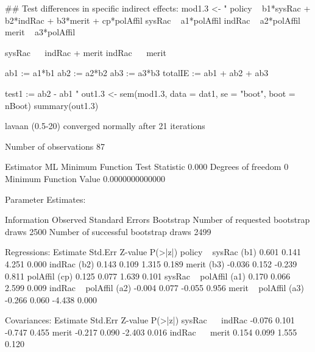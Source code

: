 \begin{Schunk}
\begin{Sinput}
 ## Test differences in specific indirect effects:
 mod1.3 <- "
 policy ~ b1*sysRac + b2*indRac + b3*merit + cp*polAffil
 sysRac ~ a1*polAffil
 indRac ~ a2*polAffil
 merit ~ a3*polAffil
 
 sysRac ~~ indRac + merit
 indRac ~~ merit
 
 ab1 := a1*b1
 ab2 := a2*b2
 ab3 := a3*b3
 totalIE := ab1 + ab2 + ab3
 
 test1 := ab2 - ab1
 "
 out1.3 <- 
     sem(mod1.3, data = dat1, se = "boot", boot = nBoot)
 summary(out1.3)
\end{Sinput}
\begin{Soutput}
lavaan (0.5-20) converged normally after  21 iterations

  Number of observations                            87

  Estimator                                         ML
  Minimum Function Test Statistic                0.000
  Degrees of freedom                                 0
  Minimum Function Value               0.0000000000000

Parameter Estimates:

  Information                                 Observed
  Standard Errors                            Bootstrap
  Number of requested bootstrap draws             2500
  Number of successful bootstrap draws            2499

Regressions:
                   Estimate  Std.Err  Z-value  P(>|z|)
  policy ~                                            
    sysRac    (b1)    0.601    0.141    4.251    0.000
    indRac    (b2)    0.143    0.109    1.315    0.189
    merit     (b3)   -0.036    0.152   -0.239    0.811
    polAffil  (cp)    0.125    0.077    1.639    0.101
  sysRac ~                                            
    polAffil  (a1)    0.170    0.066    2.599    0.009
  indRac ~                                            
    polAffil  (a2)   -0.004    0.077   -0.055    0.956
  merit ~                                             
    polAffil  (a3)   -0.266    0.060   -4.438    0.000

Covariances:
                   Estimate  Std.Err  Z-value  P(>|z|)
  sysRac ~~                                           
    indRac           -0.076    0.101   -0.747    0.455
    merit            -0.217    0.090   -2.403    0.016
  indRac ~~                                           
    merit             0.154    0.099    1.555    0.120


\end{Soutput}
\end{Schunk}
